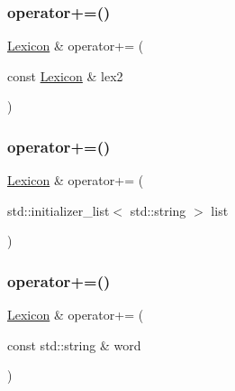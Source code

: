 \mbox{\label{classLexicon_afa70421c28007f127e7c4b24666ecc3a}} 
\subsubsection{\texorpdfstring{operator+=()}{operator+=()}\hspace{0.1cm}{\footnotesize\ttfamily [1/3]}}
{\footnotesize\ttfamily \mbox{\hyperlink{classLexicon}{Lexicon}} \& operator+= (\begin{DoxyParamCaption}\item[{const \mbox{\hyperlink{classLexicon}{Lexicon}} \&}]{lex2 }\end{DoxyParamCaption})}

\mbox{\label{classLexicon_a3080ac30a072160945adc5f860ca1785}} 
\subsubsection{\texorpdfstring{operator+=()}{operator+=()}\hspace{0.1cm}{\footnotesize\ttfamily [2/3]}}
{\footnotesize\ttfamily \mbox{\hyperlink{classLexicon}{Lexicon}} \& operator+= (\begin{DoxyParamCaption}\item[{std\+::initializer\+\_\+list$<$ std\+::string $>$}]{list }\end{DoxyParamCaption})}

\mbox{\label{classLexicon_a051f30ebfa7b8fbb7ea1dc5af23d3004}} 
\subsubsection{\texorpdfstring{operator+=()}{operator+=()}\hspace{0.1cm}{\footnotesize\ttfamily [3/3]}}
{\footnotesize\ttfamily \mbox{\hyperlink{classLexicon}{Lexicon}} \& operator+= (\begin{DoxyParamCaption}\item[{const std\+::string \&}]{word }\end{DoxyParamCaption})}

